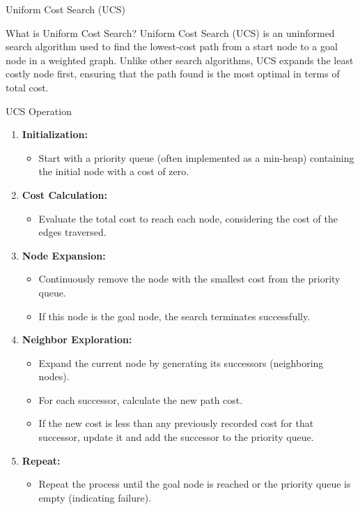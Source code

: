 \documentclass[aspectratio=169]{beamer}
\begin{document}
\begin{frame}[fragile]{Uniform Cost Search (UCS)}
  \begin{block}{What is Uniform Cost Search?}
    Uniform Cost Search (UCS) is an uninformed search algorithm used to find the lowest-cost path from a start node to a goal node in a weighted graph. Unlike other search algorithms, UCS expands the least costly node first, ensuring that the path found is the most optimal in terms of total cost.
  \end{block}
\end{frame}

\begin{frame}[fragile]{UCS Operation}
  \begin{enumerate}
    \item \textbf{Initialization:}
    \begin{itemize}
      \item Start with a priority queue (often implemented as a min-heap) containing the initial node with a cost of zero.
    \end{itemize}

    \item \textbf{Cost Calculation:}
    \begin{itemize}
      \item Evaluate the total cost to reach each node, considering the cost of the edges traversed.
    \end{itemize}

    \item \textbf{Node Expansion:}
    \begin{itemize}
      \item Continuously remove the node with the smallest cost from the priority queue.
      \item If this node is the goal node, the search terminates successfully.
    \end{itemize}

    \item \textbf{Neighbor Exploration:}
    \begin{itemize}
      \item Expand the current node by generating its successors (neighboring nodes).
      \item For each successor, calculate the new path cost.
      \item If the new cost is less than any previously recorded cost for that successor, update it and add the successor to the priority queue.
    \end{itemize}

    \item \textbf{Repeat:}
    \begin{itemize}
      \item Repeat the process until the goal node is reached or the priority queue is empty (indicating failure).
    \end{itemize}
  \end{enumerate}
\end{frame}
\end{document}
